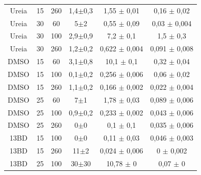 \begin{table}[h]
{\begin{tabular}{c c c | c c c}
			  Ureia   & 15         & 260        & 1,4\(\pm\)0,3 & 1,55        \(\pm\) 0,01   & 0,16        \(\pm\) 0,02   \\
			  Ureia   & 30         & 60         & 5\(\pm\)2     & 0,55        \(\pm\) 0,09   & 0,03        \(\pm\) 0,004  \\
			  Ureia   & 30         & 100        & 2,9\(\pm\)0,9 & 7,2         \(\pm\) 0,1    & 1,5         \(\pm\) 0,3    \\
			  Ureia   & 30         & 260        & 1,2\(\pm\)0,2 & 0,622       \(\pm\) 0,004  & 0,091       \(\pm\) 0,008  \\ \midrule
			  DMSO    & 15         & 60         & 3,1\(\pm\)0,8 & 10,1        \(\pm\) 0,1    & 0,32        \(\pm\) 0,04   \\
			  DMSO    & 15         & 100        & 0,1\(\pm\)0,2 & 0,256       \(\pm\) 0,006  & 0,06        \(\pm\) 0,02   \\
			  DMSO    & 15         & 260        & 1,1\(\pm\)0,2 & 0,166       \(\pm\) 0,002  & 0,022       \(\pm\) 0,004  \\
			  DMSO    & 25         & 60         & 7\(\pm\)1     & 1,78        \(\pm\) 0,03   & 0,089       \(\pm\) 0,006  \\
			  DMSO    & 25         & 100        & 0,9\(\pm\)0,2 & 0,233       \(\pm\) 0,002  & 0,043       \(\pm\) 0,006  \\
			  DMSO    & 25         & 260        & 0\(\pm\)0     & 0,1         \(\pm\) 0,1    & 0,035       \(\pm\) 0,006  \\
			  13BD    & 15         & 100        & 0\(\pm\)0     & 0,11        \(\pm\) 0,03   & 0,046       \(\pm\) 0,003  \\
			  13BD    & 15         & 260        & 11\(\pm\)2    & 0,024       \(\pm\) 0,006  & 0           \(\pm\) 0,002  \\
			  13BD    & 25         & 100        & 30\(\pm\)30   & 10,78       \(\pm\) 0      & 0,07        \(\pm\) 0		\\ \bottomrule
		\end{tabular}
	}{}
\end{table} 

	\FloatBarrier
	
